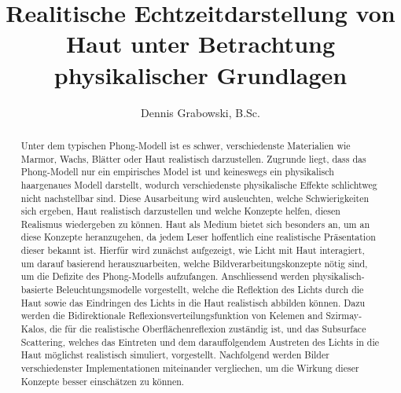 \documentclass[english,runningheads,a4paper]{llncs}[2018/03/10]
\begin{document}
\title{Realitische Echtzeitdarstellung von Haut unter Betrachtung physikalischer Grundlagen}
{}

\author{Dennis Grabowski, B.Sc.}
{}


%
%

\maketitle

\begin{abstract}
  Unter dem typischen Phong-Modell ist es schwer, verschiedenste Materialien wie Marmor, Wachs, Blätter oder Haut realistisch dar\-zu\-stellen.
  Zugrunde liegt, dass das Phong-Modell nur ein empirisches Model ist und keineswegs ein physikalisch haargenaues Modell darstellt, wodurch verschiedenste physikalische Effekte schlichtweg nicht nachstellbar sind.
  Diese Ausarbeitung wird ausleuchten, welche Schwierigkeiten sich ergeben, Haut realistisch darzustellen und welche Konzepte helfen, diesen Realismus wiedergeben zu können.
  Haut als Medium bietet sich besonders an, um an diese Konzepte heranzugehen, da jedem Leser hoffentlich eine realistische Präsentation dieser bekannt ist.
  Hierfür wird zunächst aufgezeigt, wie Licht mit Haut interagiert, um darauf basierend herauszuarbeiten, welche Bildverarbeitungskonzepte nötig sind, um die Defizite des Phong-Modells aufzufangen.
  Anschliessend werden physikalisch-basierte Beleuchtungsmodelle vorgestellt, welche die Reflektion des Lichts durch die Haut sowie das Eindringen des Lichts in die Haut realistisch abbilden können.
  Dazu werden die Bidirektionale Reflexionsverteilungsfunktion von Kelemen and Szirmay-Kalos, die für die realistische Oberflächenreflexion zuständig ist, und das Subsurface Scattering, welches das Eintreten und dem darauffolgendem Austreten des Lichts in die Haut möglichst realistisch simuliert, vorgestellt.
  Nachfolgend werden Bilder verschiedenster Implementationen miteinander vergliechen, um die Wirkung dieser Konzepte besser einschätzen zu können.
\end{abstract}
\end{document}
